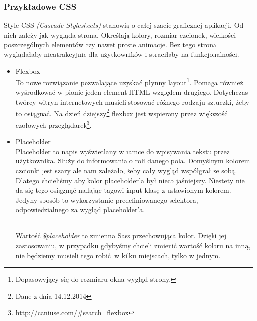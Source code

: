     \subsubsection{Przykładowe CSS}
      Style CSS \emph{(Cascade Stylesheets)} stanowią o całej szacie graficznej aplikacji. Od nich zależy jak wygląda strona. Określają kolory, rozmiar czcionek, wielkości poszczególnych elementów czy nawet proste animacje. Bez tego strona wyglądałaby nieatrakcyjnie dla użytkowników i straciłaby na funkcjonalności.
      \begin{itemize}
        \item Flexbox\\
          To nowe rozwiązanie pozwalające uzyskać płynny layout\footnote{Dopasowyjący się do rozmiaru okna wygląd strony.}. Pomaga również wyśrodkować w pionie jeden element HTML względem drugiego. Dotychczas twórcy witryn internetowych musieli stosować różnego rodzaju sztuczki, żeby to osiągnać. Na dzień dziejszy\footnote{Dane z dnia 14.12.2014} flexbox jest wspierany przez większość czołowych przeglądarek\footnote{\url{http://caniuse.com/\#search=flexbox}}.
          
        \item Placeholder\\
          Placeholder to napis wyświetlany w ramce do wpisywania tekstu przez użytkownika. Służy do informowania o roli danego pola. Domyślnym kolorem czcionki jest szary ale nam zależało, żeby cały wygląd współgrał ze sobą. Dlatego chcieliśmy aby kolor placeholder'a był nieco jaśniejszy. Niestety nie da się tego osiągnąć nadając tagowi input  klasę z ustawionym kolorem. Jedyny sposób to wykorzystanie predefiniowanego selektora, odpowiedzialnego za wygląd placeholder'a.

          \begin{code}
            
          \end{code}\\

          Wartość \emph{\$placeholder} to zmienna Sass przechowująca kolor. Dzięki jej zastosowaniu, w przypadku gdybyśmy chcieli zmienić wartość koloru na inną, nie będziemy musieli tego robić w kilku miejscach, tylko w jednym.


\end{itemize}
